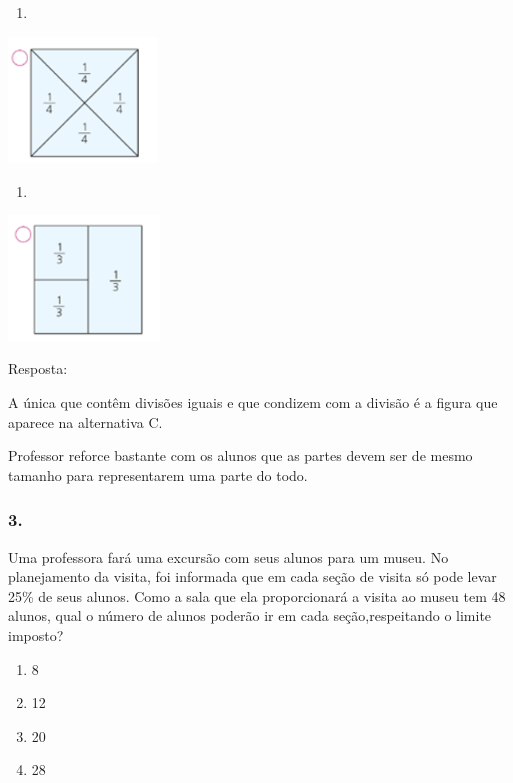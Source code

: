 \begin{enumerate}
\def\labelenumi{\alph{enumi})}
\item
\end{enumerate}

\includegraphics[width=1.56680in,height=1.31678in]{media/image125.png}

\begin{enumerate}
\def\labelenumi{\alph{enumi})}
\item
\end{enumerate}

\includegraphics[width=1.58347in,height=1.30845in]{media/image126.png}

Resposta:

A única que contêm divisões iguais e que condizem com a divisão é a
figura que aparece na alternativa C.

Professor reforce bastante com os alunos que as partes devem ser de
mesmo tamanho para representarem uma parte do todo.

\subsubsection{3.}\label{section-116}

Uma professora fará uma excursão com seus alunos para um museu. No
planejamento da visita, foi informada que em cada seção de visita só
pode levar 25\% de seus alunos. Como a sala que ela proporcionará a
visita ao museu tem 48 alunos, qual o número de alunos poderão ir em
cada seção,respeitando o limite imposto?

\begin{enumerate}
\def\labelenumi{\alph{enumi})}
\item
  8
\item
  12
\item
  20
\item
  28
\end{enumerate}

